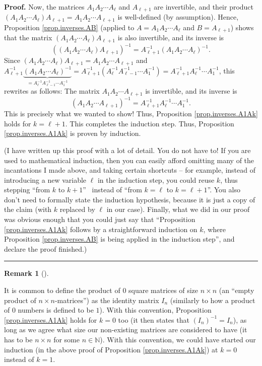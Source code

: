 \documentclass[numbers=enddot,12pt,final,onecolumn,notitlepage]{scrartcl}%
\theoremstyle{definition}
\newtheorem{remk}[theo]{Remark}
\newenvironment{remark}[1][]
{\begin{remk}[#1]\begin{leftbar}}
{\end{leftbar}\end{remk}}
\newenvironment{proof}[1][Proof]{\noindent\textbf{#1.} }{\ \rule{0.5em}{0.5em}}
\begin{document}
\begin{proof}
Now, the matrices $A_{1}A_{2}\cdots A_{\ell}$ and $A_{\ell+1}$ are invertible,
and their product \newline$\left(  A_{1}A_{2}\cdots A_{\ell}\right)
A_{\ell+1}=A_{1}A_{2}\cdots A_{\ell+1}$ is well-defined (by assumption).
Hence, Proposition \ref{prop.inverses.AB} (applied to $A=A_{1}A_{2}\cdots
A_{\ell}$ and $B=A_{\ell+1}$) shows that the matrix $\left(  A_{1}A_{2}\cdots
A_{\ell}\right)  A_{\ell+1}$ is also invertible, and its inverse is
\[
\left(  \left(  A_{1}A_{2}\cdots A_{\ell}\right)  A_{\ell+1}\right)
^{-1}=A_{\ell+1}^{-1}\left(  A_{1}A_{2}\cdots A_{\ell}\right)  ^{-1}.
\]
Since $\left(  A_{1}A_{2}\cdots A_{\ell}\right)  A_{\ell+1}=A_{1}A_{2}\cdots
A_{\ell+1}$ and \newline$A_{\ell+1}^{-1}\underbrace{\left(  A_{1}A_{2}\cdots
A_{\ell}\right)  ^{-1}}_{=A_{\ell}^{-1}A_{\ell-1}^{-1}\cdots A_{1}^{-1}%
}=A_{\ell+1}^{-1}\left(  A_{\ell}^{-1}A_{\ell-1}^{-1}\cdots A_{1}^{-1}\right)
=A_{\ell+1}^{-1}A_{\ell}^{-1}\cdots A_{1}^{-1}$, this rewrites as follows: The
matrix $A_{1}A_{2}\cdots A_{\ell+1}$ is invertible, and its inverse is
\[
\left(  A_{1}A_{2}\cdots A_{\ell+1}\right)  ^{-1}=A_{\ell+1}^{-1}A_{\ell}%
^{-1}\cdots A_{1}^{-1}.
\]
This is precisely what we wanted to show! Thus, Proposition
\ref{prop.inverses.A1Ak} holds for $k=\ell+1$. This completes the induction
step. Thus, Proposition \ref{prop.inverses.A1Ak} is proven by induction.

(I have written up this proof with a lot of detail. You do not have to! If you
are used to mathematical induction, then you can easily afford omitting many
of the incantations I made above, and taking certain shortcuts -- for example,
instead of introducing a new variable $\ell$ in the induction step, you could
reuse $k$, thus stepping \textquotedblleft from $k$ to $k+1$\textquotedblright%
\ instead of \textquotedblleft from $k=\ell$ to $k=\ell+1$\textquotedblright.
You also don't need to formally state the induction hypothesis, because it is
just a copy of the claim (with $k$ replaced by $\ell$ in our case). Finally,
what we did in our proof was obvious enough that you could just say that
\textquotedblleft Proposition \ref{prop.inverses.A1Ak} follows by a
straightforward induction on $k$, where Proposition \ref{prop.inverses.AB} is
being applied in the induction step\textquotedblright, and declare the proof finished.)
\end{proof}

\begin{remark}
\label{rmk.prop.inverses.A1Ak.k=0}It is common to define the product of $0$
square matrices of size $n\times n$ (an \textquotedblleft empty product of
$n\times n$-matrices\textquotedblright) as the identity matrix $I_{n}$
(similarly to how a product of $0$ numbers is defined to be $1$). With this
convention, Proposition \ref{prop.inverses.A1Ak} holds for $k=0$ too (it then
states that $\left(  I_{n}\right)  ^{-1}=I_{n}$), as long as we agree what
size our non-existing matrices are considered to have (it has to be $n\times
n$ for some $n\in\mathbb{N}$). With this convention, we could have started our
induction (in the above proof of Proposition \ref{prop.inverses.A1Ak}) at
$k=0$ instead of $k=1$.
\end{remark}
\end{document}
